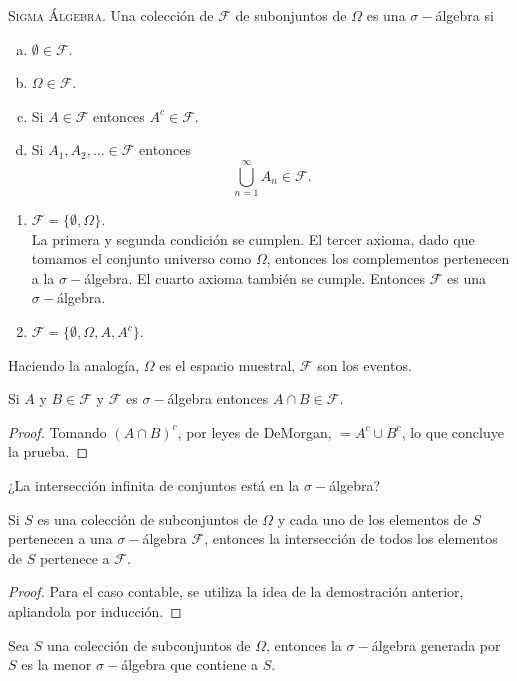 \begin{definicion}
	{\scshape{Sigma Álgebra.}} Una colección de $\mathscr{F}$ de subonjuntos de $\Omega$ es una $\sigma -$álgebra si
	\begin{enumerate}[a)]
		\item $\emptyset \in \mathscr{F}$.
		\item $\Omega \in \mathscr{F}$.
		\item Si $A \in \mathscr{F}$ entonces $A^c \in \mathscr{F}$.
		\item Si $A_1 ,A_2,\ldots \in \mathscr{F}$ entonces
			$$\bigcup _{n=1} ^\infty A_n \in \mathscr{F}.$$
	\end{enumerate}
\end{definicion}


\begin{ejemplo} \it
	\begin{enumerate}
		\item $\mathscr{F} = \{ \emptyset ,\Omega \}$. \\
			La primera y segunda condición se cumplen. El tercer axioma, dado que tomamos el conjunto universo como $\Omega$, entonces los complementos pertenecen a la $\sigma -$álgebra. El cuarto axioma también se cumple. Entonces $\mathscr{F}$ es una $\sigma -$álgebra.
		\item $\mathscr{F} = \{ \emptyset ,\Omega , A,A^c \}$.
	\end{enumerate}
\end{ejemplo}

Haciendo la analogía, $\Omega$ es el espacio muestral, $\mathscr{F}$ son los eventos.


\begin{teorema}
	Si $A$ y $B\in \mathscr{F}$ y $\mathscr{F}$ es $\sigma -$álgebra entonces $A\cap B \in \mathscr{F}$.
\end{teorema}

\begin{proof}
	Tomando $(A\cap B)^c$, por leyes de DeMorgan, $= A^c \cup B^c$, lo que concluye la prueba.
\end{proof}

¿La intersección infinita de conjuntos está en la $\sigma -$álgebra?
\begin{teorema}
	Si $S$ es una colección de subconjuntos de $\Omega$ y cada uno de los elementos de $S$ pertenecen a una $\sigma -$álgebra $\mathscr{F}$, entonces la intersección de todos los elementos de $S$ pertenece a $\mathscr{F}$.
\end{teorema}

\begin{proof}
	Para el caso contable, se utiliza la idea de la demostración anterior, apliandola por inducción.
\end{proof}


\begin{definicion}
	Sea $S$ una colección de subconjuntos de $\Omega$, entonces la $\sigma -$álgebra generada por $S$ es la menor $\sigma -$álgebra que contiene a $S$.
\end{definicion}